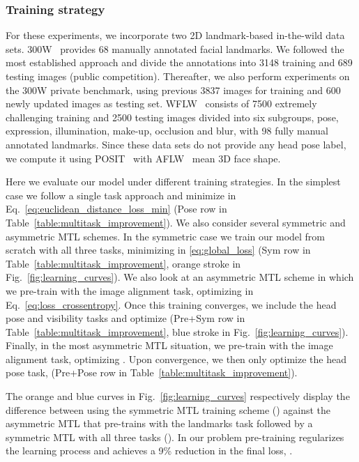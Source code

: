 \documentclass[9pt,technote,compsoc]{IEEEtran}
\begin{document}
\subsubsection{Training strategy}

For these experiments, we incorporate two 2D landmark-based in-the-wild data sets. 300W~\cite{Sagonas16} provides 68 manually annotated facial landmarks. We followed the most established approach and divide the annotations into 3148 training and 689 testing images (public competition). Thereafter, we also perform experiments on the 300W private benchmark, using previous 3837 images for training and 600 newly updated images as testing set. WFLW~\cite{Wu18a} consists of 7500 extremely challenging training and 2500 testing images divided into six subgroups, pose, expression, illumination, make-up, occlusion and blur, with 98 fully manual annotated landmarks. Since these data sets do not provide any head pose label, we compute it using POSIT~\cite{DeMenthon95} with AFLW~\cite{Koestinger11} mean 3D face shape.

Here we evaluate our model under different training strategies. In the simplest case we follow a single task approach and minimize   in Eq.~\eqref{eq:euclidean_distance_loss_min} (Pose row in Table~\ref{table:multitask_improvement}).
We also consider several symmetric and asymmetric MTL schemes. In the symmetric case we train our model from scratch with all three tasks, minimizing  in \eqref{eq:global_loss} (Sym row in Table~\ref{table:multitask_improvement}, orange stroke in Fig.~\ref{fig:learning_curves}). 
We also look at an asymmetric MTL scheme in which we pre-train  with the image alignment task, optimizing  in Eq.~\eqref{eq:loss_crossentropy}. Once this training converges, we include the head pose and visibility tasks and optimize  (Pre+Sym row in Table~\ref{table:multitask_improvement}, blue stroke in Fig.~\ref{fig:learning_curves}).
Finally, in the most asymmetric MTL situation, we pre-train with the image alignment task, optimizing . Upon convergence, we then only optimize the head pose task,  (Pre+Pose row in Table~\ref{table:multitask_improvement}). 

The orange and blue curves in Fig.~\ref{fig:learning_curves} respectively display the difference between using the symmetric MTL training scheme () against the asymmetric MTL that pre-trains with the landmarks task followed by a symmetric MTL with all three tasks (). In our problem pre-training regularizes the learning process and achieves a 9\% reduction in the final loss, . 
\end{document}
